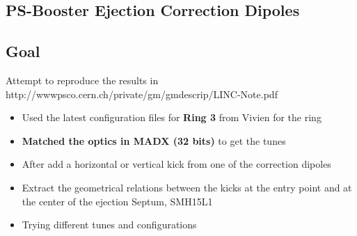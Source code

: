 \documentclass[11pt,letter,english]{article}
\begin{document}
\nocite{*} 

\small
\newcommand*{\data}{\ifcase\month\or
  January\or February\or March\or April\or May\or June\or
  July\or August\or September\or October\or November\or December\fi
  \space\number\day th,\space\number\year}
\newcommand{\blue}    {\color[named]{Blue}}
\newcommand{\black}   {\color[named]{Black}}
\newcommand{\red}     {\color[named]{Red}}
\newcommand{\green}   {\color[named]{Green}}
\newcommand{\orange}  {\color[named]{Orange}}
\newcommand{\yellow}  {\color[named]{Yellow}}
\newcommand{\magenta} {\color[named]{Magenta}}
\newcommand{\cyan}    {\color[named]{Cyan}}

\def\CP{{\sffamily CP}}

\begin{center}
 \section*{\huge{PS-Booster Ejection Correction Dipoles}} 
 \vspace {0.6cm}
\end{center}

\subsection*{Goal}

Attempt to reproduce the results in http://wwwpsco.cern.ch/private/gm/gmdescrip/LINC-Note.pdf

\begin{itemize}
\item{Used the latest configuration files for {\bf Ring 3} from Vivien for the ring}
\item{{\bf Matched the optics in MADX (32 bits)} to get the tunes}
\item{After add a horizontal or vertical kick from one of the correction dipoles}
\item{Extract the geometrical relations between the kicks at the entry point and at the center of the ejection Septum, SMH15L1}
\item{Trying different tunes and configurations}
\end{itemize}
\end{document}
